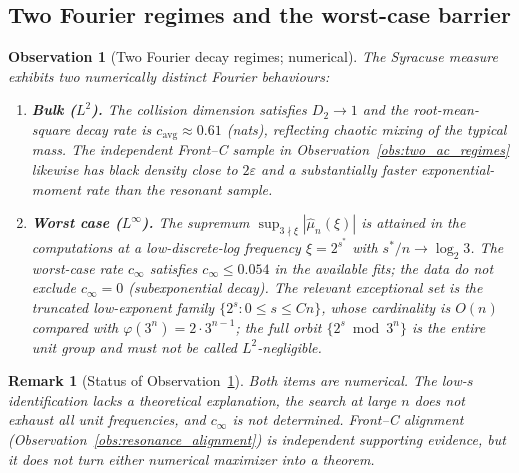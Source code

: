 \documentclass[12pt,a4paper]{article}
\newtheorem{remark}[theorem]{Remark}
\newtheorem{observation}[theorem]{Observation}
\begin{document}
\subsection{Two Fourier regimes and the worst-case barrier}

\begin{observation}[Two Fourier decay regimes; numerical]
\label{obs:two_regimes}
The Syracuse measure exhibits two numerically distinct Fourier behaviours:
\begin{enumerate}
\item[(i)] \textbf{Bulk ($L^2$).} The collision dimension satisfies $D_2\to1$ and
the root-mean-square decay rate is $c_{\mathrm{avg}}\approx0.61$ (nats),
reflecting chaotic mixing of the typical mass.  The independent Front--C
sample in Observation~\ref{obs:two_ac_regimes} likewise has black density close
to $2\varepsilon$ and a substantially faster exponential-moment rate than the
resonant sample.
\item[(ii)] \textbf{Worst case ($L^\infty$).} The supremum
$\sup_{3\nmid\xi}|\hat\mu_n(\xi)|$ is attained in the computations at a
low-discrete-log frequency $\xi=2^{s^*}$ with $s^*/n\to\log_2 3$.  The
worst-case rate $c_\infty$ satisfies $c_\infty\le0.054$ in the available fits;
the data do not exclude $c_\infty=0$ (subexponential decay).  The relevant
exceptional set is the truncated low-exponent family
$\{2^s:0\le s\le Cn\}$, whose cardinality is $O(n)$ compared with
$\varphi(3^n)=2\cdot3^{n-1}$; the full orbit $\{2^s\bmod3^n\}$ is the entire
unit group and must not be called $L^2$-negligible.
\end{enumerate}
\end{observation}

\begin{remark}[Status of Observation~\ref{obs:two_regimes}]
Both items are numerical.  The low-$s$ identification lacks a theoretical
explanation, the search at large $n$ does not exhaust all unit frequencies,
and $c_\infty$ is not determined.  Front--C alignment
(Observation~\ref{obs:resonance_alignment}) is independent supporting evidence,
but it does not turn either numerical maximizer into a theorem.
\end{remark}
\end{document}
